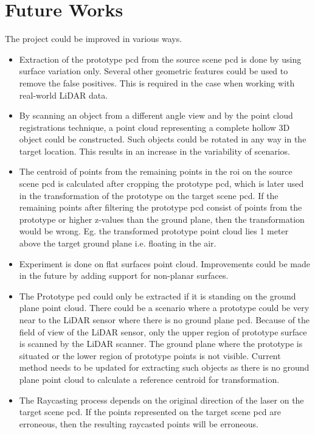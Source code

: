\section{Future Works}
The project could be improved in various ways.
\begin{itemize}
    \item Extraction of the prototype \acrshort{pcd} from the source scene \acrshort{pcd} is done by using surface variation only. Several other geometric features could be used to remove the false positives. This is required in the case when working with real-world LiDAR data.
    \item By scanning an object from a different angle view and by the point cloud registrations technique, a point cloud representing a complete hollow 3D object could be constructed. Such objects could be rotated in any way in the target location. This results in an increase in the variability of scenarios.
    \item The centroid of points from the remaining points in the \acrshort{roi} on the source scene \acrshort{pcd} is calculated after cropping the prototype \acrshort{pcd}, which is later used in the transformation of the prototype on the target scene \acrshort{pcd}. If the remaining points after filtering the prototype \acrshort{pcd} consist of points from the prototype or higher z-values than the ground plane, then the transformation would be wrong. Eg. the transformed prototype point cloud lies 1 meter above the target ground plane i.e. floating in the air.
    \item Experiment is done on flat surfaces point cloud. Improvements could be made in the future by adding support for non-planar surfaces.
    \item The Prototype \acrshort{pcd} could only be extracted if it is standing on the ground plane point cloud. There could be a scenario where a prototype could be very near to the LiDAR sensor where there is no ground plane \acrshort{pcd}. Because of the field of view of the LiDAR sensor, only the upper region of prototype surface is scanned by the LiDAR scanner. The ground plane where the prototype is situated or the lower region of prototype points is not visible. Current method needs to be updated for extracting such objects as there is no ground plane point cloud to calculate a reference centroid for transformation.
    \item The Raycasting process depends on the original direction of the laser on the target scene \acrshort{pcd}. If the points represented on the target scene \acrshort{pcd} are erroneous, then the resulting raycasted points will be erroneous.

\end{itemize}
